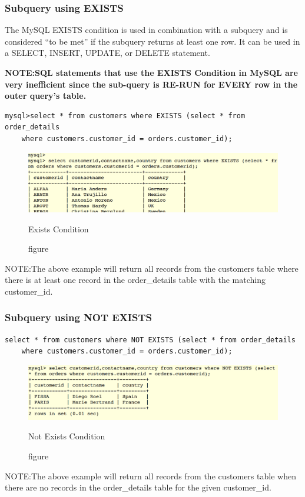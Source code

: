 \documentclass[11pt,a4paper]{article}
\begin{document}
\subsubsection*{Subquery using EXISTS}
The MySQL EXISTS condition is used in combination with a subquery and is considered ``to be met'' if the subquery returns at least one row. It can be used in a SELECT, INSERT, UPDATE, or DELETE statement.

\textbf{NOTE:SQL statements that use the EXISTS Condition in MySQL are very inefficient since the sub-query is RE-RUN for EVERY row in the outer query's table.}
\begin{verbatim}
mysql>select * from customers where EXISTS (select * from order_details
    where customers.customer_id = orders.customer_id);\end{verbatim}
\begin{figure}[h]
\begin{center}
\includegraphics[scale=0.3]{exists.png}
\caption{figure}{Exists Condition}
\end{center}
\end{figure}  
NOTE:The above example will return all records from the customers table where there is at least one record in the order\_details table with the matching customer\_id.

\subsubsection*{Subquery using NOT EXISTS}
\begin{verbatim}
select * from customers where NOT EXISTS (select * from order_details 
    where customers.customer_id = orders.customer_id);\end{verbatim}
\begin{figure}[h]
\begin{center}
\includegraphics[scale=0.3]{notexists.png}
\caption{figure}{Not Exists Condition}
\end{center}
\end{figure}  
NOTE:The above example will return all records from the customers table when there are no records in the order\_details table for the given customer\_id.
\end{document}
